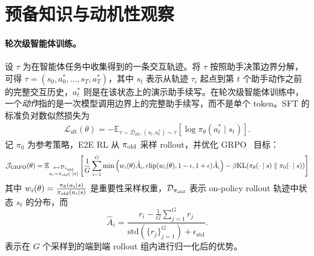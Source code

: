 \section{预备知识与动机性观察}
\label{sec:prelim}

\paragraph{轮次级智能体训练。}
设 $\tau$ 为在智能体任务中收集得到的一条交互轨迹。将 $\tau$ 按照助手决策边界分解，可得 $\tau=(s_{0},a_{0}^*,\ldots,s_{T},a_{T}^*)$，其中 $s_{t}$ 表示从轨迹 $\tau_i$ 起点到第 $t$ 个助手动作之前的完整交互历史，$a_{t}^*$ 则是在该状态上的演示助手续写。在轮次级智能体训练中，一个\emph{动作}指的是一次模型调用边界上的完整助手续写，而不是单个 token。SFT 的标准负对数似然损失为
\begin{align*}
    \mathcal{L}_{\mathrm{sft}}(\theta) = -\mathbb{E}_{\tau \sim \mathcal{D}_{\mathrm{sft}}, (s_t,a_t^*) \sim \tau} [\log \pi_\theta(a^*_t \mid s_t)].
\end{align*}
记 $\pi_0$ 为参考策略，E2E RL 从 $\pi_{\mathrm{old}}$ 采样 rollout，并优化 GRPO~\citep{shao2024deepseekmath} 目标：
\begin{align*}
    \mathcal{J}_{\mathrm{GRPO}}(\theta) = \mathbb{E}_{\substack{s \sim \mathcal{D}_{\pi_{\mathrm{old}}} \\ a_i \sim \pi_{\mathrm{old}}(\cdot \mid s)}} \left[ \frac{1}{G} \sum_{i=1}^G \min \left( w_i(\theta) \hat{A}_i, \operatorname{clip}(w_i(\theta), 1-\epsilon, 1+\epsilon) \hat{A}_i \right) - \beta \mathrm{KL}(\pi_\theta(\cdot \mid s) \parallel \pi_0(\cdot \mid s)) \right]
\end{align*}
其中 $w_i(\theta) = \frac{\pi_\theta(a_i \mid s)}{\pi_{\mathrm{old}}(a_i \mid s)}$ 是重要性采样权重，$\mathcal{D}_{\pi_{\mathrm{old}}}$ 表示 on-policy rollout 轨迹中状态 $s_t$ 的分布，而
\begin{equation}
\hat{A}_i
=
\frac{
r_i-\frac{1}{G}\sum_{j=1}^G r_j
}{
\mathrm{std}(\{r_j\}_{j=1}^G) + \epsilon_{\mathrm{std}}
}.
\label{eq:group_adv}
\end{equation}
表示在 $G$ 个采样到的端到端 rollout 组内进行归一化后的优势。

